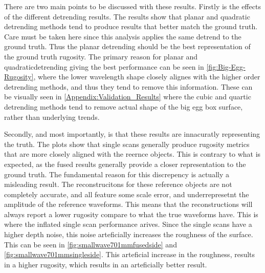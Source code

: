 There are two main points to be discussed with these results. Firstly is the effects of the different detrending results. The results show that planar and quadratic detrending methods tend to produce results that better match the ground truth. Care must be taken here since this analysis applies the same detrend to the ground truth. Thus the planar detrending should be the best representation of the ground truth rugosity. The primary reason for planar and quadraticdetrending giving the best performance can be seen in \autoref{fig:Big-Egg-Rugosity}, where the lower wavelength shape closely alignes with the higher order detrending methods, and thus they tend to remove this information. These can be visually seen in \autoref{Appendix:Validation_Results} where the cubic and quartic detrending methods tend to remove actual shape of the big egg box surface, rather than underlying trends.

Secondly, and most importantly, is that these results are innacuratly representing the truth. The plots show that single scans generally produce rugosity metrics that are more closely aligned with the reernce objects. This is contrary to what is expected, as the fused results generally provide a closer representation to the ground truth. The fundamental reason for this discrepency is actually a misleading result. The reconstrucitons for these reference objects are not completely accurate, and all feature some scale error, and underrepresetnt the amplitude of the reference waveforms. This means that the reconstructions will always report a lower rugosity compare to what the true waveforms have. This is where the inflated single scan performance arives. Since the single scans have a higher depth noise, this noise arteficially increases the roughness of the surface. This can be seen in \autoref{fig:smallwave701mmfusedside} and \autoref{fig:smallwave701mmsingleside}. This arteficial increase in the roughness, results in a higher rugosity, which results in an arteficially better result.






